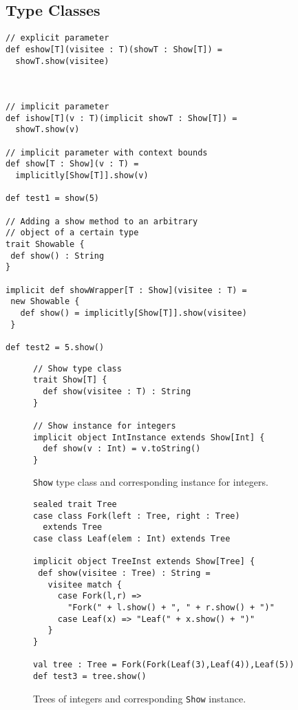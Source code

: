\documentclass[preprint]{sigplanconf}
\begin{document}
\subsection{Type Classes}
\label{sec:type-classes}

\begin{lstlisting}
// explicit parameter
def eshow[T](visitee : T)(showT : Show[T]) = 
  showT.show(visitee)
	

	
// implicit parameter
def ishow[T](v : T)(implicit showT : Show[T]) = 
  showT.show(v)
	
// implicit parameter with context bounds
def show[T : Show](v : T) = 
  implicitly[Show[T]].show(v) 
	
def test1 = show(5) 
	
// Adding a show method to an arbitrary 
// object of a certain type
trait Showable {
 def show() : String
}
	
implicit def showWrapper[T : Show](visitee : T) = 
 new Showable {
   def show() = implicitly[Show[T]].show(visitee)
 } 
	
def test2 = 5.show()
\end{lstlisting}	

\begin{figure}
\begin{lstlisting}
// Show type class
trait Show[T] {
  def show(visitee : T) : String
}

// Show instance for integers
implicit object IntInstance extends Show[Int] {
  def show(v : Int) = v.toString()
}
\end{lstlisting}
\caption{\lstinline{Show} type class and corresponding instance for integers.}
\end{figure}

\begin{figure}
\begin{lstlisting}	
sealed trait Tree 
case class Fork(left : Tree, right : Tree) 
  extends Tree
case class Leaf(elem : Int) extends Tree
	
implicit object TreeInst extends Show[Tree] {
 def show(visitee : Tree) : String = 
   visitee match {
     case Fork(l,r) => 
       "Fork(" + l.show() + ", " + r.show() + ")"
     case Leaf(x) => "Leaf(" + x.show() + ")"
   }
}
	
val tree : Tree = Fork(Fork(Leaf(3),Leaf(4)),Leaf(5))
def test3 = tree.show()
\end{lstlisting}
\caption{Trees of integers and corresponding \lstinline{Show} instance.}
\end{figure}
\end{document}

